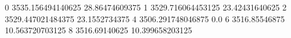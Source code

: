 0 3535.156494140625 28.86474609375
1 3529.716064453125 23.42431640625
2 3529.447021484375 23.1552734375
4 3506.291748046875 0.0
6 3516.85546875 10.563720703125
8 3516.69140625 10.399658203125
